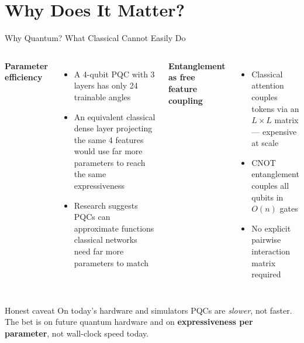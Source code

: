 \documentclass[aspectratio=169,professionalfonts]{beamer}
\begin{document}
\section{Why Does It Matter?}

\begin{frame}{Why Quantum? What Classical Cannot Easily Do}
\begin{columns}[T]
\textbf{Parameter efficiency}
\begin{itemize}
  \item A 4-qubit PQC with 3 layers has only 24 trainable angles
  \item An equivalent classical dense layer projecting the same 4 features would use far more parameters to reach the same expressiveness
  \item Research suggests PQCs can approximate functions classical networks need far more parameters to match
\end{itemize}

\textbf{Entanglement as free feature coupling}
\begin{itemize}
  \item Classical attention couples tokens via an $L \times L$ matrix --- expensive at scale
  \item CNOT entanglement couples all qubits in $O(n)$ gates
  \item No explicit pairwise interaction matrix required
\end{itemize}
\end{columns}

\vspace{0.6em}
\begin{block}{Honest caveat}
On today's hardware and simulators PQCs are \emph{slower}, not faster. The bet is on future quantum hardware and on \textbf{expressiveness per parameter}, not wall-clock speed today.
\end{block}
\end{frame}
\end{document}
